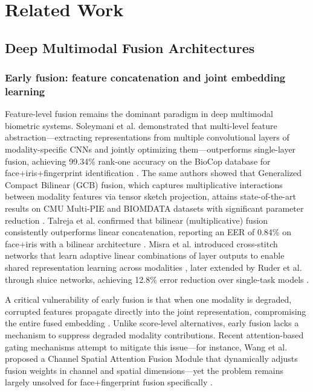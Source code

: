 \documentclass[10pt,journal,compsoc]{IEEEtran}
\begin{document}
\section{Related Work}
\label{sec:related_work}

\subsection{Deep Multimodal Fusion Architectures}

\subsubsection{Early fusion: feature concatenation and joint embedding learning}

Feature-level fusion remains the dominant paradigm in deep multimodal biometric systems. Soleymani et al. demonstrated that multi-level feature abstraction---extracting representations from multiple convolutional layers of modality-specific CNNs and jointly optimizing them---outperforms single-layer fusion, achieving 99.34\% rank-one accuracy on the BioCop database for face+iris+fingerprint identification \cite{REF3}. The same authors showed that Generalized Compact Bilinear (GCB) fusion, which captures multiplicative interactions between modality features via tensor sketch projection, attains state-of-the-art results on CMU Multi-PIE and BIOMDATA datasets with significant parameter reduction \cite{REF2}. Talreja et al. confirmed that bilinear (multiplicative) fusion consistently outperforms linear concatenation, reporting an EER of 0.84\% on face+iris with a bilinear architecture \cite{REF11}. Misra et al. introduced cross-stitch networks that learn adaptive linear combinations of layer outputs to enable shared representation learning across modalities \cite{REF4}, later extended by Ruder et al. through sluice networks, achieving 12.8\% error reduction over single-task models \cite{REF5}.

A critical vulnerability of early fusion is that when one modality is degraded, corrupted features propagate directly into the joint representation, compromising the entire fused embedding \cite{REF6}. Unlike score-level alternatives, early fusion lacks a mechanism to suppress degraded modality contributions. Recent attention-based gating mechanisms attempt to mitigate this issue---for instance, Wang et al. proposed a Channel Spatial Attention Fusion Module that dynamically adjusts fusion weights in channel and spatial dimensions---yet the problem remains largely unsolved for face+fingerprint fusion specifically \cite{REF9}.
\end{document}
